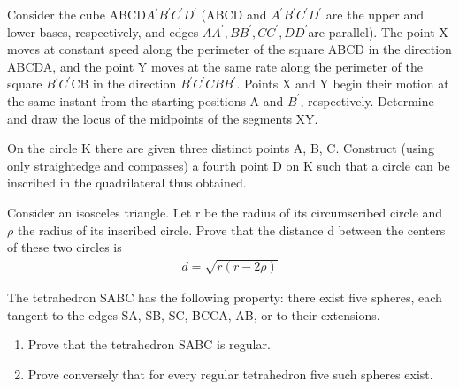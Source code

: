 \item Consider the cube ABCD$A^{'}B^{'}C^{'}D^{'}$ (ABCD and $A^{'}B^{'}C^{'}D^{'}$ are the upper and
lower bases, respectively, and edges $AA^{'}, BB^{'}, CC^{'}, DD^{'}$are parallel). The
point X moves at constant speed along the perimeter of the square ABCD
in the direction ABCDA, and the point Y moves at the same rate along
the perimeter of the square $B^{'}C^{'}$CB in the direction $B^{'}C^{'}C BB^{'}$. Points X
and Y begin their motion at the same instant from the starting positions A
and $B^{'}$, respectively. Determine and draw the locus of the midpoints of the
segments XY.

\item On the circle K there are given three distinct points A, B, C. Construct (using only straightedge and compasses) a fourth point D on K such that a circle
can be inscribed in the quadrilateral thus obtained.

\item Consider an isosceles triangle. Let r be the radius of its circumscribed circle and $\rho$ the radius of its inscribed circle. Prove that the distance d between
the centers of these two circles is
\begin{align*}
d=\sqrt{r(r-2\rho)}
\end{align*}

\item The tetrahedron SABC has the following property: there exist five spheres,
each tangent to the edges SA, SB, SC, BCCA, AB, or to their extensions.
\begin{enumerate}
\item Prove that the tetrahedron SABC is regular.
\item Prove conversely that for every regular tetrahedron five such spheres
exist.
\end{enumerate} 
 

